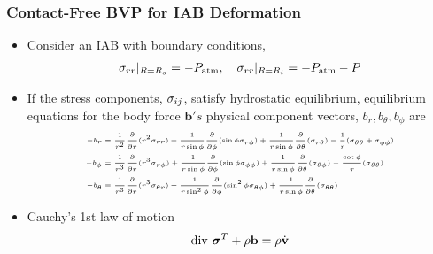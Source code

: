 \begin{frame}
	\frametitle{Contact-Free BVP for IAB Deformation}
	\begin{itemize}
		\item \small Consider an IAB with boundary conditions,
		\begin{align}
		\sigma_{rr}|_{R=R_o} = -P_\text{atm}, \quad \sigma_{rr}|_{R=R_i} = -P_\text{atm} - P
		\label{eq:boundary_conds}
		\end{align}
		\item \small{If the stress components, $\sigma_{ij}$, satisfy hydrostatic equilibrium,  equilibrium equations for the body force $\bm{b}'s$ physical component vectors, $b_r, b_\theta, b_\phi$ are}
		\begin{subequations}
			\tiny{
			\begin{align}
			-b_r &= \frac{1}{r^2}\frac{\partial}{\partial r}(r^2 \stresscomp_{rr}) + \frac{1}{r \sin\phi}\frac{\partial}{\partial \phi}(\sin \phi \stresscomp_{r \phi}) + \frac{1}{r \sin\phi}\frac{\partial}{\partial \theta}(\stresscomp_{r \theta}) -  \frac{1}{r}(\stresscomp_{\theta\theta}+ \stresscomp_{\phi \phi})
			\label{eq:polar_coord_a}
			\\
			-b_\phi &= \frac{1}{r^3}\frac{\partial}{\partial r}(r^3 \stresscomp_{r\phi}) + \frac{1}{r \sin\phi}\frac{\partial}{\partial \phi}(\sin \phi \stresscomp_{\phi \phi}) + \frac{1}{r \sin\phi}\frac{\partial}{\partial \theta}(\stresscomp_{\theta \phi}) -  \frac{\cot \phi}{r}(\stresscomp_{\theta\theta})
			\label{eq:polar_coord_b}
			\\
			-b_\theta &= \frac{1}{r^3}\frac{\partial}{\partial r}(r^3 \stresscomp_{\theta r}) + \frac{1}{r \sin^2\phi}\frac{\partial}{\partial \phi}(\sin^2 \phi \stresscomp_{\theta \phi}) + \frac{1}{r \sin\phi}\frac{\partial}{\partial \theta}(\stresscomp_{\theta \theta})
			\label{eq:polar_coords_c}
			\end{align}
		}
			\label{eq:polar_coords}
		\end{subequations}
	\item \small Cauchy's 1st law of motion
	\begin{align}
	\text{div } \bm{\sigma}^T  + \rho \textbf{b} = \rho \dot{\textbf{v}}
	\label{eq:cauchy_law1}
	\end{align}
	\end{itemize}
\end{frame}

